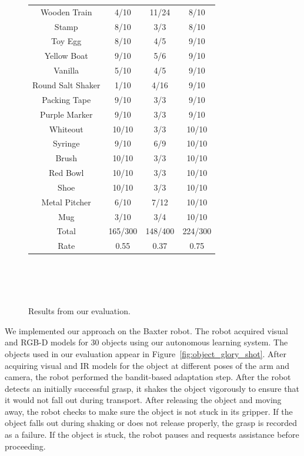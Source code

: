 \documentclass[conference,onecolumn]{IEEEtran}
\begin{document}
\begin{figure}
{{\begin{tabular}{cccc}
Wooden Train        & 4/10          &  11/24       &  8/10 \\
Stamp    	    & 8/10          &  3/3         &  8/10 \\
Toy Egg    	    & 8/10          &  4/5         &  9/10 \\
Yellow Boat    	    & 9/10          &  5/6         &  9/10 \\
Vanilla	   	    & 5/10          &  4/5         &  9/10 \\
Round Salt Shaker   & 1/10          &  4/16        &  9/10 \\
Packing Tape        & 9/10          &  3/3         &  9/10 \\
Purple Marker       & 9/10          &  3/3         &  9/10 \\
Whiteout    	    & 10/10         &  3/3         &  10/10\\
Syringe    	    & 9/10          &  6/9         &  10/10\\
Brush    	    & 10/10         &  3/3         &  10/10\\
Red Bowl    	    & 10/10         &  3/3         &  10/10\\
Shoe    	    & 10/10         &  3/3         &  10/10\\
Metal Pitcher       & 6/10          &  7/12        &  10/10\\
Mug    		    & 3/10          &  3/4         &  10/10\\
\midrule
Total		    & 165/300       &  148/400     & 224/300\\
Rate		    & 0.55          &  0.37        & 0.75\\
\bottomrule
\end{tabular}
~\\~
~\\~
}}
\caption{Results from our evaluation. \label{fig:evaluation}}
\end{figure}

We implemented our approach on the Baxter robot.  The robot acquired
visual and RGB-D models for 30 objects using our autonomous learning
system.  The objects used in our evaluation appear in
Figure~\ref{fig:object_glory_shot}.  After acquiring visual and IR
models for the object at different poses of the arm and camera, the
robot performed the bandit-based adaptation step.  After the robot
detects an initially successful grasp, it shakes the object vigorously
to ensure that it would not fall out during transport. After releasing
the object and moving away, the robot checks to make sure the object
is not stuck in its gripper. If the object falls out during shaking or
does not release properly, the grasp is recorded as a failure. If the
object is stuck, the robot pauses and requests assistance before
proceeding.
\end{document}
